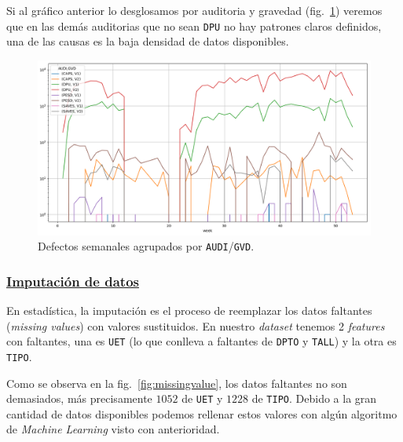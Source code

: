 \documentclass[a4paper,12pt]{article}
\begin{document}
		\clearpage
		
		Si al gráfico anterior lo desglosamos por auditoria y gravedad (fig.~\ref{fig:defectsperaudigvdweek}) veremos que en las demás auditorias que no sean \texttt{DPU} no hay patrones claros definidos, una de las causas es la baja densidad de datos disponibles.
		
		\begin{figure}[H]
			\begin{center}
				\includegraphics[width=1\textwidth]{audigvd.png}
				\caption{Defectos semanales agrupados por \texttt{AUDI}/\texttt{GVD}.}
				\label{fig:defectsperaudigvdweek}
			\end{center}
		\end{figure}
		
		\clearpage
		
		\subsubsection{\href{https://github.com/GeraCollante/tesis-icomp-machinelearning/blob/main/DataImputation.ipynb}{\color{blue}Imputación de datos}}\label{DataImputation}
		 
		En estadística, la imputación es el proceso de reemplazar los datos faltantes (\textit{missing values}) con valores sustituidos. En nuestro \textit{dataset} tenemos 2 \textit{features} con faltantes, una es \texttt{UET} (lo que conlleva a faltantes de \texttt{DPTO} y \texttt{TALL}) y la otra es \texttt{TIPO}.
		
		Como se observa en la fig.~\ref{fig:missingvalue}, los datos faltantes no son demasiados, más precisamente $1052$ de \texttt{UET} y $1228$ de \texttt{TIPO}. Debido a la gran cantidad de datos disponibles podemos rellenar estos valores con algún algoritmo de \textit{Machine Learning} visto con anterioridad.
		
\end{document}
